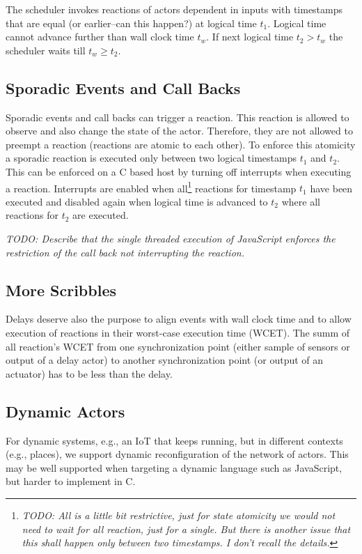 \documentclass[sigconf]{acmart}
\newcommand{\todo}[1]{{\emph{TODO: #1}}}
\begin{document}
The scheduler invokes reactions of actors dependent in inputs with timestamps
that are equal (or earlier--can this happen?) at logical time $t_1$.
Logical time cannot advance further than wall clock time $t_w$. If next logical
time $t_2 > t_w$ the scheduler waits till $t_w \ge t_2$.

\subsection{Sporadic Events and Call Backs}

Sporadic events and call backs can trigger a reaction. This reaction is allowed
to observe and also change the state of the actor. Therefore, they are not allowed
to preempt a reaction (reactions are atomic to each other). To enforce this atomicity
a sporadic reaction is executed only between two logical timestamps $t_1$ and $t_2$.
This can be enforced on a C based host by turning off interrupts when executing
a reaction. Interrupts are enabled when all\footnote{\todo{All is a little bit restrictive,
just for state atomicity we would not need to wait for all reaction, just for a single.
But there is another issue that this shall happen only between two timestamps.
I don't recall the details.}}
reactions for timestamp $t_1$ have been executed and disabled again when logical
time is advanced to $t_2$ where all reactions for $t_2$ are executed.


\todo{Describe that the single threaded execution of JavaScript enforces
the restriction of the call back not interrupting the reaction.}

\subsection{More Scribbles}

Delays deserve also the purpose to align events with wall clock time and to
allow execution of reactions in their worst-case execution time (WCET).
The summ of all reaction's WCET from one synchronization point (either
sample of sensors or output of a delay actor) to another synchronization
point (or output of an actuator) has to be less than the delay.

\subsection{Dynamic Actors}

For dynamic systems, e.g., an IoT that keeps running, but in different contexts
(e.g., places), we support dynamic reconfiguration of the network of actors.
This may be well supported when targeting a dynamic language such as JavaScript,
but harder to implement in C.
\end{document}
